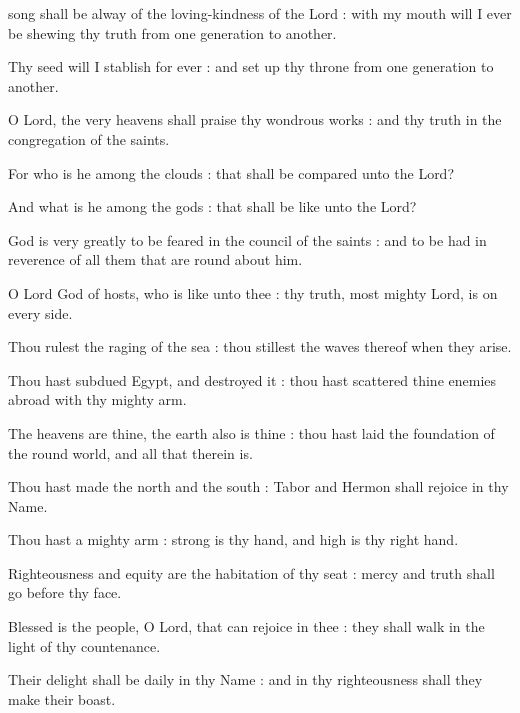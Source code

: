 

 song shall be alway of the loving-kindness of the Lord : with my mouth will I ever be shewing thy truth from one generation to another.\par
{}
Thy seed will I stablish for ever : and set up thy throne from one generation to another.\par
{}O Lord, the very heavens shall praise thy wondrous works : and thy truth in the congregation of the saints.\par
{}For who is he among the clouds : that shall be compared unto the Lord?\par
{}And what is he among the gods : that shall be like unto the Lord?\par
{}God is very greatly to be feared in the council of the saints : and to be had in reverence of all them that are round about him.\par
{}O Lord God of hosts, who is like unto thee : thy truth, most mighty Lord, is on every side.\par
{}Thou rulest the raging of the sea : thou stillest the waves thereof when they arise.\par
{}Thou hast subdued Egypt, and destroyed it : thou hast scattered thine enemies abroad with thy mighty arm.\par
{}The heavens are thine, the earth also is thine : thou hast laid the foundation of the round world, and all that therein is.\par
{}Thou hast made the north and the south : Tabor and Hermon shall rejoice in thy Name.\par
{}Thou hast a mighty arm : strong is thy hand, and high is thy right hand.\par
{}Righteousness and equity are the habitation of thy seat : mercy and truth shall go before thy face.\par
{}Blessed is the people, O Lord, that can rejoice in thee : they shall walk in the light of thy countenance.\par
{}Their delight shall be daily in thy Name : and in thy righteousness shall they make their boast.\par
